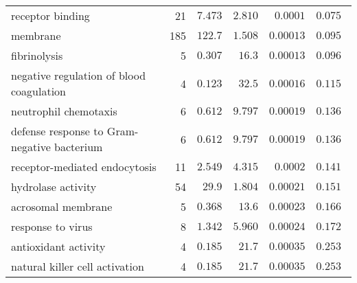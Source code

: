 \begin{longtable*}{|l|r|r|r|r|r|}
    receptor binding                                      & 21                      & $ 7.473$                & $ 2.810$   & $0.0001$             & $ 0.075~~$                      \\
    membrane                                              & 185                     & $ 122.7$                & $ 1.508$   & $0.00013$            & $ 0.095~~$                      \\
    fibrinolysis                                          & 5                       & $ 0.307$                & $  16.3$     & $0.00013$            & $ 0.096~~$                      \\
    negative regulation of blood coagulation              & 4                       & $ 0.123$                & $  32.5$     & $0.00016$            & $ 0.115~~$                      \\
    neutrophil chemotaxis                                 & 6                       & $ 0.612$                & $ 9.797$   & $0.00019$            & $ 0.136~~$                      \\
    defense response to Gram-negative bacterium           & 6                       & $ 0.612$                & $ 9.797$   & $0.00019$            & $ 0.136~~$                      \\
    receptor-mediated endocytosis                         & 11                      & $ 2.549$                & $ 4.315$   & $0.0002$             & $ 0.141~~$                      \\
    hydrolase activity                                    & 54                      & $  29.9$                  & $ 1.804$   & $0.00021$            & $ 0.151~~$                      \\
    acrosomal membrane                                    & 5                       & $ 0.368$                & $  13.6$     & $0.00023$            & $ 0.166~~$                      \\
    response to virus                                     & 8                       & $ 1.342$                & $ 5.960$   & $0.00024$            & $ 0.172~~$                      \\
    antioxidant activity                                  & 4                       & $ 0.185$                & $  21.7$     & $0.00035$            & $ 0.253~~$                      \\
    natural killer cell activation                        & 4                       & $ 0.185$                & $  21.7$     & $0.00035$            & $ 0.253~~$                      \\

\end{longtable*}
